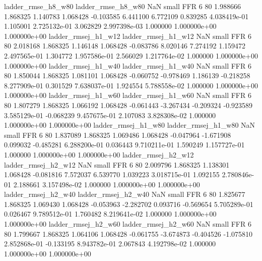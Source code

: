       ladder_rmse_h8_w80       ladder_rmse_h8_w80                   NaN      small      FFR                 6 80 1.988666       1.868325 1.140783       1.068428   -0.103585      6.441100      6.772109     0.839285   4.038419e-01  1.105001 2.725132e-01     3.062829   2.997398e-03            1.000000    1.000000e+00        1.000000e+00
     ladder_rmsej_h1_w12      ladder_rmsej_h1_w12                   NaN      small      FFR                 6 80 2.018168       1.868325 1.146148       1.068428   -0.083786      8.020146      7.274192     1.159472   2.497565e-01  1.304772 1.957586e-01     2.566029   1.217764e-02            1.000000    1.000000e+00        1.000000e+00
     ladder_rmsej_h1_w40      ladder_rmsej_h1_w40                   NaN      small      FFR                 6 80 1.850044       1.868325 1.081101       1.068428   -0.060752     -0.978469      1.186139    -0.218258   8.277909e-01  0.301529 7.638037e-01     1.924554   5.788558e-02            1.000000    1.000000e+00        1.000000e+00
     ladder_rmsej_h1_w60      ladder_rmsej_h1_w60                   NaN      small      FFR                 6 80 1.807279       1.868325 1.066192       1.068428   -0.061443     -3.267434     -0.209324    -0.923589   3.585129e-01 -0.068239 9.457675e-01     2.107083   3.828308e-02            1.000000    1.000000e+00        1.000000e+00
     ladder_rmsej_h1_w80      ladder_rmsej_h1_w80                   NaN      small      FFR                 6 80 1.837089       1.868325 1.069486       1.068428   -0.047964     -1.671908      0.099032    -0.485281   6.288200e-01  0.036443 9.710211e-01     1.590249   1.157727e-01            1.000000    1.000000e+00        1.000000e+00
     ladder_rmsej_h2_w12      ladder_rmsej_h2_w12                   NaN      small      FFR                 6 80 2.009796       1.868325 1.138301       1.068428   -0.081816      7.572037      6.539770     1.039223   3.018715e-01  1.092155 2.780846e-01     2.188661   3.157498e-02            1.000000    1.000000e+00        1.000000e+00
     ladder_rmsej_h2_w40      ladder_rmsej_h2_w40                   NaN      small      FFR                 6 80 1.825677       1.868325 1.069430       1.068428   -0.053963     -2.282702      0.093716    -0.569654   5.705289e-01  0.026467 9.789512e-01     1.760482   8.219641e-02            1.000000    1.000000e+00        1.000000e+00
     ladder_rmsej_h2_w60      ladder_rmsej_h2_w60                   NaN      small      FFR                 6 80 1.799667       1.868325 1.064106       1.068428   -0.061755     -3.674873     -0.404526    -1.075810   2.852868e-01 -0.133195 8.943782e-01     2.067843   4.192798e-02            1.000000    1.000000e+00        1.000000e+00
